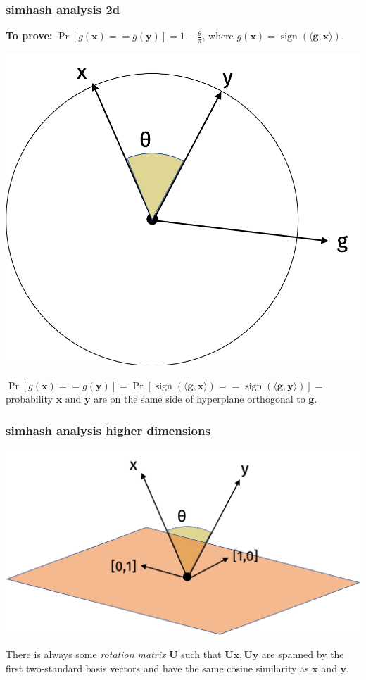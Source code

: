 \documentclass[compress]{beamer}
\newcommand{\bv}[1]{\mathbf{#1}}
\DeclareMathOperator{\sign}{sign}
\begin{document}
\begin{frame}
	\frametitle{simhash analysis 2d}
	\textbf{To prove:}  $\Pr[g(\bv{x}) == g(\bv{y})] = 1 - \frac{\theta}{\pi}$,  where $g(\bv{x}) = \sign(\langle \bv{g}, \bv{x} \rangle)$.
	\vspace{-.5em}
	\begin{center}
		\includegraphics[width=.5\textwidth]{simhash1.png}
	\end{center}
	$\Pr[g(\bv{x}) == g(\bv{y})] = \Pr[\sign(\langle \bv{g}, \bv{x} \rangle) == \sign(\langle \bv{g}, \bv{y} \rangle)] = $ probability  $\bv{x}$ and $\bv{y}$ are on the same side of hyperplane orthogonal to $\bv{g}$.
\end{frame}

\begin{frame}
	\frametitle{simhash analysis higher dimensions}
	\begin{center}
		\includegraphics[width=.7\textwidth]{high_dim1.png}
	\end{center}
There is always some \emph{rotation matrix} $\bv{U}$ such that $\bv{U}\bv{x},\bv{U}\bv{y}$ are spanned by the first two-standard basis vectors and have the same cosine similarity as $\bv{x}$ and $\bv{y}$.
\end{frame}
\end{document}
